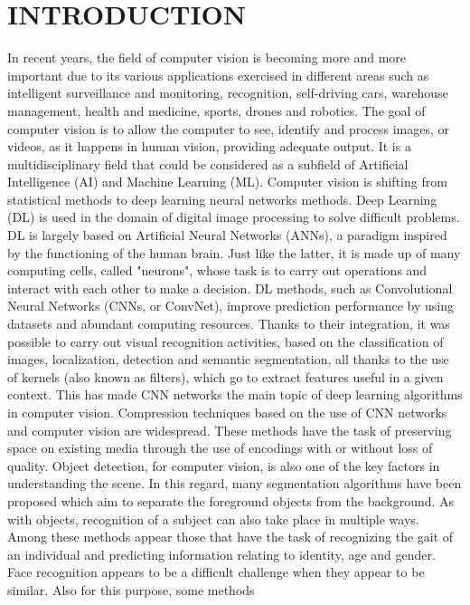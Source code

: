 \section*{INTRODUCTION}
In recent years, the field of computer vision is becoming more and more important 
due to its various applications exercised in different areas such as 
intelligent surveillance and monitoring, recognition, self-driving cars, warehouse 
management, health and medicine, sports, drones and robotics. The 
goal of computer vision is to allow the computer to see, identify and process 
images, or videos, as it happens in human vision, providing adequate output. 
It is a multidisciplinary field that could be considered as a subfield of 
Artificial Intelligence (AI) and Machine Learning (ML). Computer vision is 
shifting from statistical methods to deep learning neural networks methods. 
Deep Learning (DL) is used in the domain of digital image processing to solve 
difficult problems. DL is largely based on Artificial Neural Networks (ANNs), 
a paradigm inspired by the functioning of the human brain. Just like the latter, 
it is made up of many computing cells, called "neurons", whose task 
is to carry out operations and interact with each other to make a decision. 
DL methods, such as Convolutional Neural Networks (CNNs, or ConvNet), 
improve prediction performance by using datasets and abundant computing 
resources. Thanks to their integration, it was possible to carry out visual 
recognition activities, based on the classification of images, localization, detection 
and semantic segmentation, all thanks to the use of kernels (also 
known as filters), which go to extract features useful in a given context. This 
has made CNN networks the main topic of deep learning algorithms in computer 
vision. Compression techniques based on the use of CNN networks and 
computer vision are widespread. These methods have the task of preserving 
space on existing media through the use of encodings with or without loss of 
quality. Object detection, for computer vision, is also one of the key factors 
in understanding the scene. In this regard, many segmentation algorithms 
have been proposed which aim to separate the foreground objects from the 
background. As with objects, recognition of a subject can also take place 
in multiple ways. Among these methods appear those that have the task 
of recognizing the gait of an individual and predicting information relating 
to identity, age and gender. Face recognition appears to be a difficult challenge 
when they appear to be similar. Also for this purpose, some methods 
